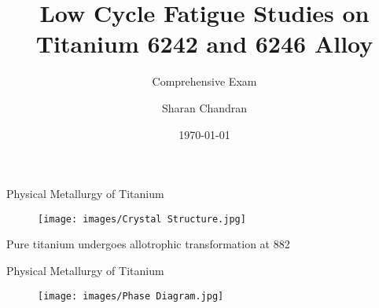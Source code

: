 \documentclass[10pt]{beamer}
\title{Low Cycle Fatigue Studies on Titanium 6242 and 6246 Alloy}
\subtitle{Comprehensive Exam}
\date{\today}
\date{}
\author{Sharan Chandran}
\institute{Indian Institute of Science}
\begin{document}

\maketitle


\iffalse
\begin{frame}{Things to do before Comprehensive Exam}
\begin{enumerate}
\item Quantitative Metallography
\begin{enumerate}
\item $\alpha$ phase volume fraction
\item $\alpha$ phase grain size
\end{enumerate}
\item \sout{Heat Treatment - TBD. Maintain same $\alpha$ phase fraction (as received) with different $\alpha$ grain size.}
\item Tensile test for as received specimens - Ti-6242
\item Initial EBSD Texture
\item \color{red} Fatigue Test - For Ti-6242 at 0.95, 0.85, 0.8 YS
\end{enumerate}
\end{frame}
\fi

{%
\begin{frame}[fragile]{Physical Metallurgy of Titanium}

\begin{figure}[H]
    \centering
        \texttt{[image: images/Crystal Structure.jpg]}
\end{figure}

Pure titanium undergoes allotrophic transformation at 882 \degC





\end{frame}
}

{%

\begin{frame}[fragile]{Physical Metallurgy of Titanium}

\begin{figure}[H]
    \centering
        \texttt{[image: images/Phase Diagram.jpg]}
        
        
\end{figure}

\end{frame}
}
\end{document}
